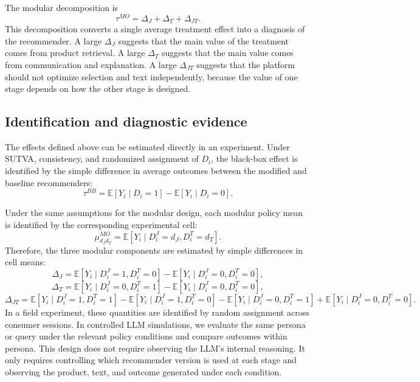 \documentclass[11pt]{article}
\newcommand{\Expect}{\mathbb{E}}
\newcommand{\Y}{Y}
\begin{document}
The modular decomposition is
\begin{equation}
\tau^{MO} = \Delta_J + \Delta_T + \Delta_{JT}.
\label{eq:modular-decomposition}
\end{equation}
This decomposition converts a single average treatment effect into a diagnosis of the recommender. A large $\Delta_J$ suggests that the main value of the treatment comes from product retrieval. A large $\Delta_T$ suggests that the main value comes from communication and explanation. A large $\Delta_{JT}$ suggests that the platform should not optimize selection and text independently, because the value of one stage depends on how the other stage is designed.

\subsection{Identification and diagnostic evidence}

The effects defined above can be estimated directly in an experiment. Under SUTVA, consistency, and randomized assignment of $D_i$, the black-box effect is identified by the simple difference in average outcomes between the modified and baseline recommenders:
\begin{equation}
\tau^{BB} = \Expect[\Y_i \mid D_i = 1] - \Expect[\Y_i \mid D_i = 0].
\label{eq:identify-bb}
\end{equation}

Under the same assumptions for the modular design, each modular policy mean is identified by the corresponding experimental cell:
\begin{equation}
\mu_{d_Jd_T}^{MO} = \Expect[\Y_i \mid D_i^J = d_J, D_i^T = d_T].
\label{eq:identify-modular-cell}
\end{equation}
Therefore, the three modular components are estimated by simple differences in cell means:
\begin{equation*}
\Delta_J = \Expect[\Y_i \mid D_i^J = 1, D_i^T = 0] - \Expect[\Y_i \mid D_i^J = 0, D_i^T = 0],
\end{equation*}
\begin{equation*}
\Delta_T = \Expect[\Y_i \mid D_i^J = 0, D_i^T = 1] - \Expect[\Y_i \mid D_i^J = 0, D_i^T = 0],
\end{equation*}
\begin{equation*}
\Delta_{JT} = \Expect[\Y_i \mid D_i^J = 1, D_i^T = 1] - \Expect[\Y_i \mid D_i^J = 1, D_i^T = 0] - \Expect[\Y_i \mid D_i^J = 0, D_i^T = 1] + \Expect[\Y_i \mid D_i^J = 0, D_i^T = 0].
\end{equation*}
In a field experiment, these quantities are identified by random assignment across consumer sessions. In controlled LLM simulations, we evaluate the same persona or query under the relevant policy conditions and compare outcomes within persona. This design does not require observing the LLM's internal reasoning. It only requires controlling which recommender version is used at each stage and observing the product, text, and outcome generated under each condition.
\end{document}

